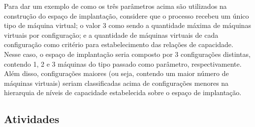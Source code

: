 \documentclass[12pt]{article}
\begin{document}
Para dar um exemplo de como os três parâmetros acima são utilizados na construção do espaço de implantação, considere que o processo recebeu um único tipo de máquina virtual; o valor 3 como sendo a quantidade máxima de máquinas virtuais por configuração; e a quantidade de máquinas virtuais de cada configuração como critério para estabelecimento das relações de capacidade. Nesse caso, o espaço de implantação seria composto por 3 configurações distintas, contendo 1, 2 e 3 máquinas do tipo passado como parâmetro, respectivamente. Além disso, configurações maiores (ou seja, contendo um maior número de máquinas virtuais) seriam classificadas acima de configurações menores na hierarquia de níveis de capacidade estabelecida sobre o espaço de implantação.


%


\subsection{Atividades}
\end{document}
